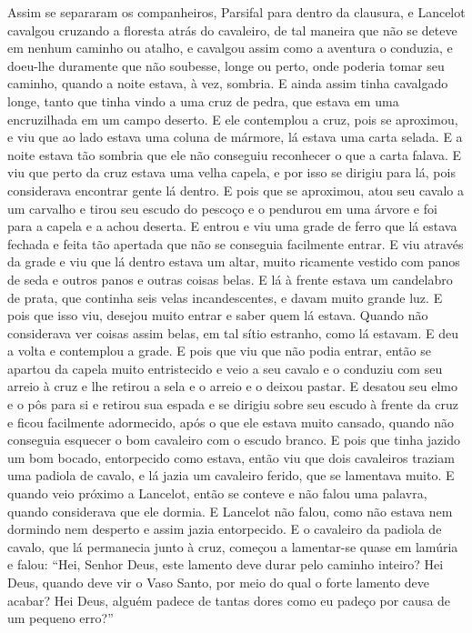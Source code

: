 Assim se separaram os companheiros, Parsifal para dentro da clausura, e
Lancelot cavalgou cruzando a floresta atrás do cavaleiro, de tal maneira que
não se deteve em nenhum caminho ou atalho, e cavalgou assim como a aventura o
conduzia, e doeu-lhe duramente que não soubesse, longe ou perto, onde poderia
tomar seu caminho, quando a noite estava, à vez, sombria. E ainda assim tinha
cavalgado longe, tanto que tinha vindo a uma cruz de pedra, que estava em uma
encruzilhada em um campo deserto. E ele contemplou a cruz, pois se aproximou, e
viu que ao lado estava uma coluna de mármore, lá estava uma carta selada. E a
noite estava tão sombria que ele não conseguiu reconhecer o que a carta falava.
E viu que perto da cruz estava uma velha capela, e por isso se dirigiu para lá,
pois considerava encontrar gente lá dentro. E pois que se aproximou, atou seu
cavalo a um carvalho e tirou seu escudo do pescoço e o pendurou em uma árvore e
foi para a capela e a achou deserta. E entrou e viu uma grade de ferro que lá
estava fechada e feita tão apertada que não se conseguia facilmente entrar. E
viu através da grade e viu que lá dentro estava um altar, muito ricamente
vestido com panos de seda e outros panos e outras coisas belas. E lá à frente
estava um candelabro de prata, que continha seis velas incandescentes, e davam
muito grande luz. E pois que isso viu, desejou muito entrar e saber quem lá
estava. Quando não considerava ver coisas assim belas, em tal sítio estranho,
como lá estavam. E deu a volta e contemplou a grade. E pois que viu que não
podia entrar, então se apartou da capela muito entristecido e veio a seu cavalo
e o conduziu com seu arreio à cruz e lhe retirou a sela e o arreio e o deixou
pastar. E desatou seu elmo e o pôs para si e retirou sua espada e se dirigiu
sobre seu escudo à frente da cruz e ficou facilmente adormecido, após o que ele
estava muito cansado, quando não conseguia esquecer o bom cavaleiro com o
escudo branco. E pois que tinha jazido um bom bocado, entorpecido como estava,
então viu que dois cavaleiros traziam uma padiola de cavalo, e lá jazia um
cavaleiro ferido, que se lamentava muito. E quando veio próximo a Lancelot,
então se conteve e não falou uma palavra, quando considerava que ele dormia. E
Lancelot não falou, como não estava nem dormindo nem desperto e assim jazia
entorpecido. E o cavaleiro da padiola de cavalo, que lá permanecia junto à
cruz, começou a lamentar-se quase em lamúria e falou: “Hei, Senhor Deus, este
lamento deve durar pelo caminho inteiro? Hei Deus, quando deve vir o Vaso
Santo, por meio do qual o forte lamento deve acabar? Hei Deus, alguém padece de
tantas dores como eu padeço por causa de um pequeno erro?”

